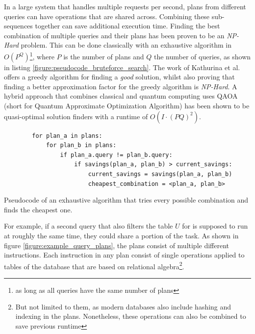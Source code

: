 In a large system that handles multiple requests per second, plans from different queries can have operations that are shared across. Combining these sub-sequences together can save additional execution time\cite{roy_multi-query_2009}. Finding the best combination of multiple queries and their plans has been proven to be an \emph{NP-Hard} problem\cite{sellis_multiple-query_1990}. This can be done classically with an exhaustive algorithm in $O(P^Q)$\footnote{as long as all queries have the same number of plans}, where $P$ is the number of plans and $Q$ the number of queries, as shown in listing \ref{figure:pseudocode_bruteforce_search}. The work of Kathurina et al.\cite{kathuria_provable_mqo} offers a greedy algorithm for finding a \emph{good} solution, whilst also proving that finding a better approximation factor for the greedy algorithm is \emph{NP-Hard}. A hybrid approach that combines classical and quantum computing uses QAOA (short for Quantum Approximate Optimization Algorithm)\cite{farhi_quantum_2014} has been shown to be quasi-optimal solution finders with a runtime of $O(I \cdot (PQ)^2)$\cite{fankhauser_multiple_2021}. \par


\begin{listing}[!ht]
    \centering
    \begin{verbatim}
        for plan_a in plans:
            for plan_b in plans:
                if plan_a.query != plan_b.query:
                    if savings(plan_a, plan_b) > current_savings:
                        current_savings = savings(plan_a, plan_b)
                        cheapest_combination = <plan_a, plan_b>
    \end{verbatim}
    \caption{Pseudocode of an exhaustive algorithm that tries every possible combination and finds the cheapest one.}
    \label{figure:pseudocode_bruteforce_search}
\end{listing}

 For example, if a second query that also filters the table $U$ for  is supposed to run at roughly the same time, they could share a portion of the task. As shown in figure \ref{figure:example_query_plans}, the plans consist of multiple different instructions. Each instruction in any plan consist of single operations applied to tables of the database that are based on relational algebra\cite{codd_relational_1970}\footnote{But not limited to them, as modern databases also include hashing and indexing in the plans. Nonetheless, these operations can also be combined to save previous runtime}. 
 
